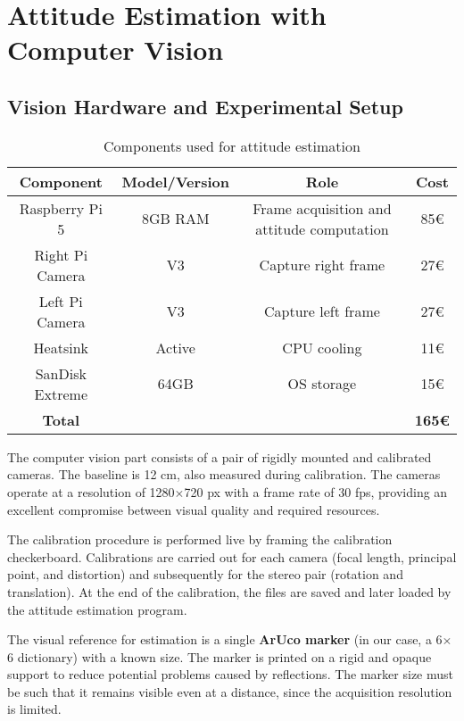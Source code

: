 \chapter{Attitude Estimation with Computer Vision}
\thispagestyle{empty}
\section{Vision Hardware and Experimental Setup}
\begin{table}[h]
    \centering
    \begin{tabular}{|c|c|c|c|}
        \hline
        \textbf{Component} & \textbf{Model/Version} & \textbf{Role} & \textbf{Cost} \\
        \hline
        Raspberry Pi 5 & 8GB RAM & Frame acquisition and attitude computation & 85€ \\
        \hline
        Right Pi Camera & V3 & Capture right frame & 27€ \\
        \hline
        Left Pi Camera & V3 & Capture left frame & 27€ \\
        \hline
        Heatsink & Active & CPU cooling & 11€ \\
        \hline
        SanDisk Extreme & 64GB & OS storage & 15€ \\
        \hline
        \textbf{Total} & & & \textbf{165€} \\
        \hline
    \end{tabular}
    \caption{Components used for attitude estimation}
    \label{tab:example}
\end{table}

The computer vision part consists of a pair of rigidly mounted and calibrated cameras. The baseline is 12 cm, also measured during calibration. The cameras operate at a resolution of 1280$\times$720 px with a frame rate of 30 fps, providing an excellent compromise between visual quality and required resources.

The calibration procedure is performed live by framing the calibration checkerboard. Calibrations are carried out for each camera (focal length, principal point, and distortion) and subsequently for the stereo pair (rotation and translation). At the end of the calibration, the files are saved and later loaded by the attitude estimation program.

The visual reference for estimation is a single \textbf{ArUco marker} (in our case, a 6$\times$6 dictionary) with a known size. The marker is printed on a rigid and opaque support to reduce potential problems caused by reflections. The marker size must be such that it remains visible even at a distance, since the acquisition resolution is limited.

